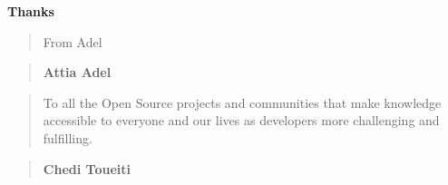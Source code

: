 
\thispagestyle{empty}
\addtocounter{page}{-1}

\begin{center}
\textbf{Thanks}\\
\bigskip
\bigskip
\bigskip
\end{center}
\begin{quote}
\selectfont
From Adel
\end{quote}

\begin{quote}
\begin{flushright}
\selectfont
\textbf{Attia Adel}
\end{flushright}
\end{quote}

\medskip

\begin{quote}
\selectfont
To all the Open Source projects and communities that make knowledge accessible to everyone and our lives as developers more challenging and fulfilling.
\end{quote}

\begin{quote}
\begin{flushright}
\selectfont
\textbf{Chedi Toueiti}
\end{flushright}
\end{quote}